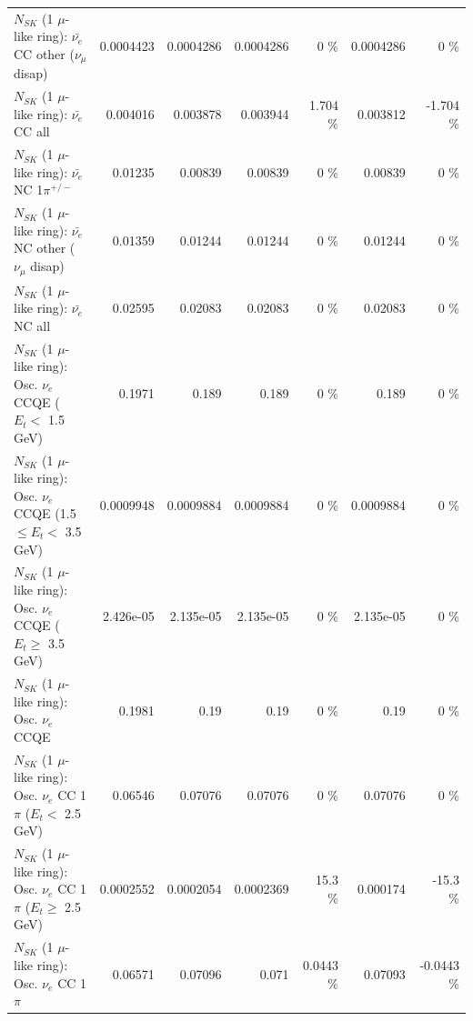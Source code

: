 \begin{table}
\begin{tabular}{| l | r | r | r  r | r  r |}
          $N_{SK}$ (1 $\mu$-like ring): $\bar{\nu_e}$ CC other ($\nu_\mu$ disap) &       0.0004423 &       0.0004286 &       0.0004286 &        0 \%  &       0.0004286 &        0 \%  \\ 
                            $N_{SK}$ (1 $\mu$-like ring): $\bar{\nu_{e}}$ CC all &        0.004016 &        0.003878 &        0.003944 &    1.704 \%  &        0.003812 &   -1.704 \%  \\ 
\hline
                     $N_{SK}$ (1 $\mu$-like ring): $\bar{\nu_e}$ NC 1$\pi^{+/-}$ &         0.01235 &         0.00839 &         0.00839 &        0 \%  &         0.00839 &        0 \%  \\ 
          $N_{SK}$ (1 $\mu$-like ring): $\bar{\nu_e}$ NC other ($\nu_\mu$ disap) &         0.01359 &         0.01244 &         0.01244 &        0 \%  &         0.01244 &        0 \%  \\ 
                            $N_{SK}$ (1 $\mu$-like ring): $\bar{\nu_{e}}$ NC all &         0.02595 &         0.02083 &         0.02083 &        0 \%  &         0.02083 &        0 \%  \\ 
\hline
\hline
\hline
             $N_{SK}$ (1 $\mu$-like ring): Osc. $\nu_e$ CCQE ($E_{t} <$ 1.5 GeV) &          0.1971 &           0.189 &           0.189 &        0 \%  &           0.189 &        0 \%  \\ 
    $N_{SK}$ (1 $\mu$-like ring): Osc. $\nu_e$ CCQE (1.5 $\leq E_{t} <$ 3.5 GeV) &       0.0009948 &       0.0009884 &       0.0009884 &        0 \%  &       0.0009884 &        0 \%  \\ 
          $N_{SK}$ (1 $\mu$-like ring): Osc. $\nu_e$ CCQE ($E_{t} \geq$ 3.5 GeV) &       2.426e-05 &       2.135e-05 &       2.135e-05 &        0 \%  &       2.135e-05 &        0 \%  \\ 
\hline
                                 $N_{SK}$ (1 $\mu$-like ring): Osc. $\nu_e$ CCQE &          0.1981 &            0.19 &            0.19 &        0 \%  &            0.19 &        0 \%  \\ 
\hline
        $N_{SK}$ (1 $\mu$-like ring): Osc. $\nu_e$ CC 1$\pi$ ($E_{t} <$ 2.5 GeV) &         0.06546 &         0.07076 &         0.07076 &        0 \%  &         0.07076 &        0 \%  \\ 
     $N_{SK}$ (1 $\mu$-like ring): Osc. $\nu_e$ CC 1$\pi$ ($E_{t} \geq$ 2.5 GeV) &       0.0002552 &       0.0002054 &       0.0002369 &     15.3 \%  &        0.000174 &    -15.3 \%  \\ 
\hline
                            $N_{SK}$ (1 $\mu$-like ring): Osc. $\nu_e$ CC 1$\pi$ &         0.06571 &         0.07096 &           0.071 &   0.0443 \%  &         0.07093 &  -0.0443 \%  \\ 

\end{tabular}
\end{table}
